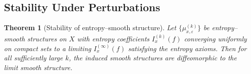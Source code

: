 \documentclass[11pt]{amsart}
\newtheorem{theorem}{Theorem}[section]
\theoremstyle{definition}
\theoremstyle{remark}
\begin{document}
\subsection{Stability Under Perturbations}

\begin{theorem}[Stability of entropy--smooth structure]
\label{thm:stability}
Let $\{\mu^{(k)}_{x,\varepsilon}\}$ be entropy--smooth structures on $X$
with entropy coefficients $I^{(k)}_x(f)$ converging uniformly on compact
sets to a limiting $I^{(\infty)}_x(f)$ satisfying the entropy axioms.
Then for all sufficiently large $k$, the induced smooth structures are
diffeomorphic to the limit smooth structure.
\end{theorem}
\end{document}
